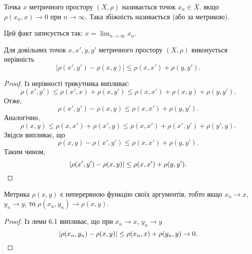 \begin{definition}
Точка $x$ метричного простору $(X, \rho)$
називається  точок $x_n \in X$, якщо
$\rho(x_n, x) \to 0$  при $n \to \infty$. Така збіжність називається
 (або за метрикою).

Цей факт записується так: $x = \lim_{n \to \infty} x_n$.
\end{definition}

\begin{lemma}
Для довільних точок $x, x', y, y'$ метричного
простору $(X, \rho)$ виконується нерівність
\begin{equation*}
    |\rho(x', y') - \rho(x, y)| \le \rho(x, x') + \rho(y, y').
\end{equation*}
\end{lemma}

\begin{proof}
Із нерівності трикутника випливає:
\begin{equation*}
    \rho(x', y') \le
    \rho(x', x) + \rho(x, y') \le
    \rho(x, x') + \rho(x, y) + \rho(y, y').
\end{equation*}
Отже,
\begin{equation*}
    \rho(x', y') - \rho(x, y) \le
    \rho(x, x') + \rho(y, y').
\end{equation*}
Аналогічно,
\begin{equation*}
    \rho(x, y) \le
    \rho(x, x') + \rho(x', y) \le
    \rho(x, x') + \rho(x', y') + \rho( y', y).
\end{equation*}
Звідси випливає, що
\begin{equation*}
    \rho(x, y) - \rho(x', y') \le
    \rho(x, x') + \rho(y, y').
\end{equation*}
Таким чином,
\begin{equation*}
    |\rho(x', y') - \rho(x, y)| \le
    \rho(x, x') + \rho(y, y'). \qedhere
\end{equation*}
\end{proof}

\begin{lemma}
Метрика $\rho(x, y)$ є неперервною функцію своїх
аргументів, тобто якщо $x_n \to x$, $y_n \to y$, то
$\rho(x_n, y_n) \to \rho(x, y)$.
\end{lemma}

\begin{proof}
Із леми 6.1 випливає, що при $x_n \to x$, $y_n \to y$
\begin{equation*}
    |\rho(x_n, y_n) - \rho(x, y)| \le
    \rho(x_n, x) + \rho(y_n, y) \to
    0. \qedhere
\end{equation*}
\end{proof}

